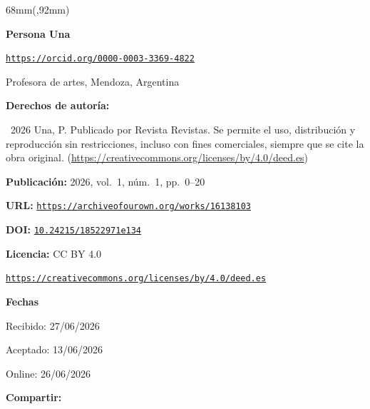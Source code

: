 \documentclass{article}
\newlength{\gbbloquex}
\begin{document}
\begin{textblock*}{68mm}(\gbbloquex,92mm)
{\setlength{\leftskip}{0pt}\setlength{\parindent}{0pt}%
\noindent\begin{minipage}[t]{68mm}
\sffamily\small\setlength{\parskip}{1pt}
{\bfseries\color{azulrevista}Persona Una}\par
{\scriptsize\texttt{\href{https://orcid.org/0000-0003-3369-4822}{https://orcid.org/0000-0003-3369-4822}}}\par
Profesora de artes, Mendoza, Argentina\par
\vspace{6pt}
{\bfseries\color{azulrevista!70}Derechos de autor\'ia:}\par
\textcopyright\ 2026 Una, P. Publicado por Revista Revistas. Se permite el uso, distribución y reproducción sin restricciones, incluso con fines comerciales, siempre que se cite la obra original. (\href{https://creativecommons.org/licenses/by/4.0/deed.es}{https://creativecommons.org/licenses/by/4.0/deed.es})\par\vspace{6pt}
{\bfseries\color{azulrevista!70}Publicación:} 2026, vol.~1, n\'um.~1, pp.~0--20\par\vspace{6pt}
{\bfseries\color{azulrevista!70}URL:} {\scriptsize\texttt{\href{https://archiveofourown.org/works/16138103}{https://archiveofourown.org/works/16138103}}}\par\vspace{6pt}
{\bfseries\color{azulrevista!70}DOI:} {\scriptsize\texttt{\href{https://doi.org/10.24215/18522971e134}{10.24215/18522971e134}}}\par\vspace{6pt}
{\bfseries\color{azulrevista!70}Licencia:} CC BY 4.0\par
{\scriptsize\texttt{\href{https://creativecommons.org/licenses/by/4.0/deed.es}{https://creativecommons.org/licenses/by/4.0/deed.es}}}\par
\vspace{6pt}
{\bfseries\color{azulrevista!70}Fechas}\par\vspace{2pt}
Recibido: 27/06/2026\par
Aceptado: 13/06/2026\par
Online: 26/06/2026\par
\vspace{6pt}
\vspace{6pt}
{\bfseries\color{azulrevista!70}Compartir:}\par\vspace{3pt}

\end{minipage}}
\end{textblock*}
\end{document}
